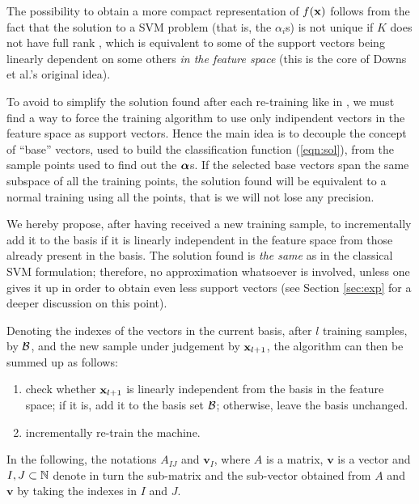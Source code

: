 The possibility to obtain a more compact representation of $f(\xx)$ follows
from the fact that the solution to a SVM problem (that is, the $\alpha_i$s)
is not unique if $K$ does not have full rank \cite{Burges98}, which is
equivalent to some of the support vectors being linearly dependent on some
others \emph{in the feature space} (this is the core of Downs et al.'s
\cite{DownsGM01} original idea).

To avoid to simplify the solution found after each re-training like in
\cite{DownsGM01}, we must find a way to force the training algorithm to
use only indipendent vectors in the feature space as support vectors.
Hence the main idea is to decouple the concept of ``base'' vectors, used
to build the classification function (\ref{eqn:sol}), from the sample
points used to find out the $\aa$s. If the selected base vectors span the
same subspace of all the training points, the solution found will be equivalent
to a normal training using all the points, that is we will not lose any
precision.

We hereby propose, after having received a new training sample, to
incrementally add it to the basis if it is linearly independent
in the feature space from those already present in the basis.
The solution found is \emph{the same} as in the classical SVM formulation;
therefore, no approximation whatsoever is involved, unless one gives it up
in order to obtain even less support vectors (see Section \ref{sec:exp} for
a deeper discussion on this point).

Denoting the indexes of the vectors in the current basis, after $l$ training
samples, by $\b$, and the new sample under judgement by $\xx_{l+1}$, the
algorithm can then be summed up as follows:

\begin{enumerate}

  \item check whether $\xx_{l+1}$ is linearly independent from the
        basis in the feature space; if it is, add it to the basis set $\b$;
        otherwise, leave the basis unchanged.

  \item incrementally re-train the machine.

\end{enumerate}

In the following, the notations $A_{IJ}$ and $\mathbf{v}_I$, where $A$
is a matrix, $\mathbf{v}$ is a vector and $I,J \subset \NN$ denote in
turn the sub-matrix and the sub-vector obtained from $A$ and
$\mathbf{v}$ by taking the indexes in $I$ and $J$.

